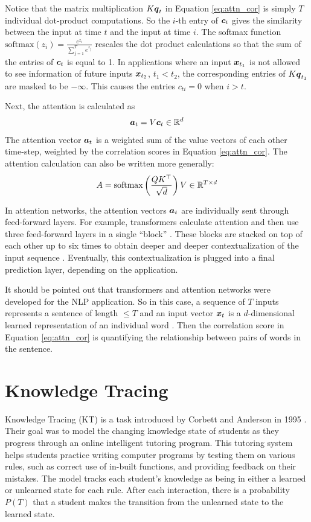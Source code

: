 Notice that the matrix multiplication $K \boldsymbol{q}_t$ in Equation \ref{eq:attn_cor} is simply $T$ individual dot-product computations. So the $i$-th entry of $\boldsymbol{c}_t$ gives the similarity between the input at time $t$ and the input at time $i$. The softmax function $\text{softmax}(z_i) = \frac{e^{z_i}}{\sum_{j=1}^T e^{z_j}}$ rescales the dot product calculations so that the sum of the entries of $\boldsymbol{c}_t$ is equal to 1. In applications where an input $\boldsymbol{x}_{t_1}$ is not allowed to see information of future inputs $\boldsymbol{x}_{t_2}$, $t_1<t_2$, the corresponding entries of $K\boldsymbol{q}_{t_1}$ are masked to be $-\infty$. This causes the entries $c_{ti} = 0$ when $i > t$.

Next, the attention is calculated as 
\begin{equation}
  \boldsymbol{a}_t = V \boldsymbol{c}_t \in \mathbb{R}^d
  \label{eq:attn}
\end{equation}
The attention vector $\boldsymbol{a}_t$ is a weighted sum of the value vectors of each other time-step, weighted by the correlation scores in Equation \ref{eq:attn_cor}. The attention calculation can also be written more generally:
\begin{equation}
  A = \text{softmax}\left(\frac{QK^\top}{\sqrt{d}} \right) V \in \mathbb{R}^{T \times d}
  \label{eq:attn_matrix}
\end{equation}

In attention networks, the attention vectors $\boldsymbol{a}_t$ are individually sent through feed-forward layers. For example, transformers calculate attention and then use three feed-forward layers in a single ``block'' \cite{vaswani2017}. These blocks are stacked on top of each other up to six times to obtain deeper and deeper contextualization of the input sequence \cite{dai2019}. Eventually, this contextualization is plugged into a final prediction layer, depending on the application.

It should be pointed out that transformers and attention networks were developed for the NLP application. So in this case, a sequence of $T$ inputs represents a sentence of length $\leq T$ and an input vector $\boldsymbol{x}_t$ is a $d$-dimensional learned representation of an individual word \cite{mikolov2013}. Then the correlation score in Equation \ref{eq:attn_cor} is quantifying the relationship between pairs of words in the sentence.



\section*{Knowledge Tracing}
Knowledge Tracing (KT) is a task introduced by Corbett and Anderson in 1995 \cite{corbett1995}. Their goal was to model the changing knowledge state of students as they progress through an online intelligent tutoring program. This tutoring system helps students practice writing computer programs by testing them on various rules, such as correct use of in-built functions, and providing feedback on their mistakes. The model tracks each student's knowledge as being in either a learned or unlearned state for each rule. After each interaction, there is a probability $P(T)$ that a student makes the transition from the unlearned state to the learned state.

